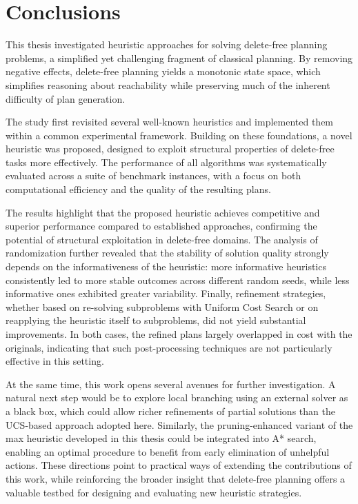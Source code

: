 \chapter{Conclusions}
This thesis investigated heuristic approaches for solving delete-free planning problems, a simplified yet challenging fragment of classical planning.
By removing negative effects, delete-free planning yields a monotonic state space, which simplifies reasoning about reachability while preserving
much of the inherent difficulty of plan generation.

The study first revisited several well-known heuristics and implemented them within a common experimental framework. Building on these foundations,
a novel heuristic was proposed, designed to exploit structural properties of delete-free tasks more effectively. The performance of all algorithms
was systematically evaluated across a suite of benchmark instances, with a focus on both computational efficiency and the quality of the resulting plans.

The results highlight that the proposed heuristic achieves competitive and superior performance compared to established approaches,
confirming the potential of structural exploitation in delete-free domains. The analysis of randomization further revealed that the stability of solution
quality strongly depends on the informativeness of the heuristic: more informative heuristics consistently led to more stable outcomes across different
random seeds, while less informative ones exhibited greater variability. Finally, refinement strategies, whether based on re-solving subproblems with
Uniform Cost Search or on reapplying the heuristic itself to subproblems, did not yield substantial improvements. In both cases,
the refined plans largely overlapped in cost with the originals, indicating that such post-processing techniques are not particularly effective in this setting.

At the same time, this work opens several avenues for further investigation. A natural next step would be to explore local branching using an external
solver as a black box, which could allow richer refinements of partial solutions than the \textsc{UCS}-based approach adopted here.
Similarly, the pruning-enhanced variant of the max heuristic developed in this thesis could be integrated into \textsc{A*} search, enabling an optimal procedure
to benefit from early elimination of unhelpful actions. These directions point to practical ways of extending the contributions of this work,
while reinforcing the broader insight that delete-free planning offers a valuable testbed for designing and evaluating new heuristic strategies.
